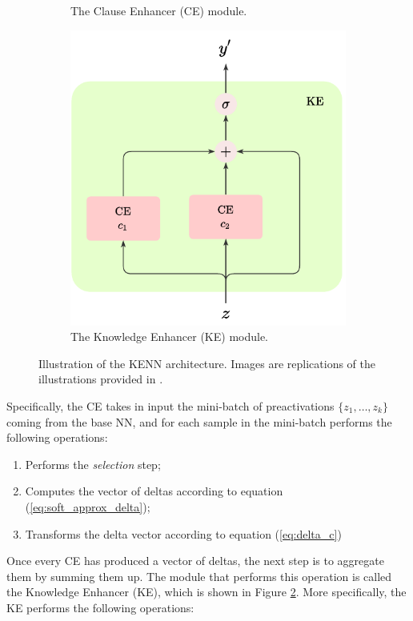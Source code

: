 \begin{figure}
\begin{subfigure}{.5\textwidth}
		\caption{The Clause Enhancer (CE) module.}
		\label{fig:ce}
	\end{subfigure}%
	\begin{subfigure}{.5\textwidth}
		\centering
		\includegraphics[width=0.9\linewidth]{figures/KE.pdf}
		\caption{The Knowledge Enhancer (KE) module.}
		\label{fig:ke}	
	\end{subfigure}
	\caption{Illustration of the KENN architecture. Images are replications of the illustrations provided in \cite{daniele2019kenn}.}
	\label{fig:kenn_architecture_unary}
\end{figure}
Specifically, the CE takes in input the mini-batch of preactivations $\{z_1,\dots,z_k\}$ coming from the base NN, and for each sample in the mini-batch performs the following operations:
\begin{enumerate}
	\item Performs the \textit{selection} step;
	\item Computes the vector of deltas according to equation (\ref{eq:soft_approx_delta});
	\item Transforms the delta vector according to equation (\ref{eq:delta_c})
\end{enumerate}
Once every CE has produced a vector of deltas, the next step is to aggregate them by summing them up. The module that performs this operation is called the Knowledge Enhancer (KE), which is shown in Figure \ref{fig:ke}. More specifically, the KE performs the following operations:
